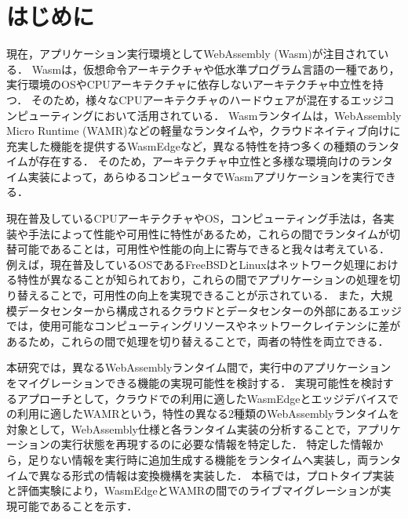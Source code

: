 \chapter{はじめに}
現在，アプリケーション実行環境としてWebAssembly (Wasm)が注目されている．
Wasmは，仮想命令アーキテクチャや低水準プログラム言語の一種であり，実行環境のOSやCPUアーキテクチャに依存しないアーキテクチャ中立性を持つ．
そのため，様々なCPUアーキテクチャのハードウェアが混在するエッジコンピューティングにおいて活用されている．
Wasmランタイムは，WebAssembly Micro Runtime (WAMR)などの軽量なランタイムや，クラウドネイティブ向けに充実した機能を提供するWasmEdgeなど，異なる特性を持つ多くの種類のランタイムが存在する．
そのため，アーキテクチャ中立性と多様な環境向けのランタイム実装によって，あらゆるコンピュータでWasmアプリケーションを実行できる．

現在普及しているCPUアーキテクチャやOS，コンピューティング手法は，各実装や手法によって性能や可用性に特性があるため，これらの間でランタイムが切替可能であることは，可用性や性能の向上に寄与できると我々は考えている．
例えば，現在普及しているOSであるFreeBSDとLinuxはネットワーク処理における特性が異なることが知られており，これらの間でアプリケーションの処理を切り替えることで，可用性の向上を実現できることが示されている\cite{adaptive-os-switching}．
また，大規模データセンターから構成されるクラウドとデータセンターの外部にあるエッジでは，使用可能なコンピューティングリソースやネットワークレイテンシに差があるため，これらの間で処理を切り替えることで，両者の特性を両立できる．

本研究では，異なるWebAssemblyランタイム間で，実行中のアプリケーションをマイグレーションできる機能の実現可能性を検討する．
実現可能性を検討するアプローチとして，クラウドでの利用に適したWasmEdgeとエッジデバイスでの利用に適したWAMRという，特性の異なる2種類のWebAssemblyランタイムを対象として，WebAssembly仕様と各ランタイム実装の分析することで，アプリケーションの実行状態を再現するのに必要な情報を特定した．
特定した情報から，足りない情報を実行時に追加生成する機能をランタイムへ実装し，両ランタイムで異なる形式の情報は変換機構を実装した．
本稿では，プロトタイプ実装と評価実験により，WasmEdgeとWAMRの間でのライブマイグレーションが実現可能であることを示す．
